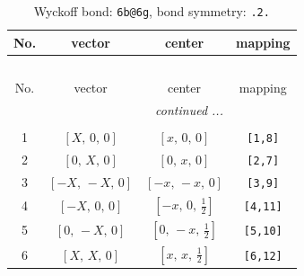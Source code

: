 \documentclass[fleqn,8pt]{jsarticle}
\begin{document}
\begin{longtable}{cccc}
\caption{Wyckoff bond: {\tt 6b@6g}, bond symmetry: {\tt .2.}}
 \\
 \hline \hline
No. & vector & center & mapping \\ \hline \endfirsthead

\multicolumn{3}{l}{\tablename\ \thetable{}} \\
 \hline \hline
No. & vector & center & mapping \\ \hline \endhead

 \hline \hline
\multicolumn{3}{r}{\footnotesize\it continued ...} \\ \endfoot

 \hline \hline
\multicolumn{3}{r}{} \\ \endlastfoot

1 & $\left[ X,\, 0,\, 0 \right]$ & $\left[ x,\, 0,\, 0 \right]$ & {\tt [1,8]} \\ \hline
2 & $\left[ 0,\, X,\, 0 \right]$ & $\left[ 0,\, x,\, 0 \right]$ & {\tt [2,7]} \\ \hline
3 & $\left[ - X,\, - X,\, 0 \right]$ & $\left[ - x,\, - x,\, 0 \right]$ & {\tt [3,9]} \\ \hline
4 & $\left[ - X,\, 0,\, 0 \right]$ & $\left[ - x,\, 0,\, \frac{1}{2} \right]$ & {\tt [4,11]} \\ \hline
5 & $\left[ 0,\, - X,\, 0 \right]$ & $\left[ 0,\, - x,\, \frac{1}{2} \right]$ & {\tt [5,10]} \\ \hline
6 & $\left[ X,\, X,\, 0 \right]$ & $\left[ x,\, x,\, \frac{1}{2} \right]$ & {\tt [6,12]} \\
\end{longtable}
\renewcommand{\arraystretch}{1.2}
\end{document}

